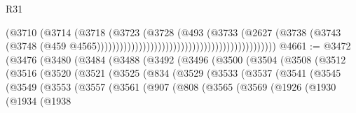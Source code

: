 \begin{lexlean}{R31}
\begin{coremodule}
                                                                          (@3710
                                                                            (@3714
                                                                              (@3718
                                                                                (@3723
                                                                                  (@3728
                                                                                    (@493
                                                                                      (@3733
                                                                                        (@2627
                                                                                          (@3738
                                                                                            (@3743
                                                                                              (@3748
                                                                                                (@459
                                                                                                  @4565)))))))))))))))))))))))))))))))))))))))))))))))
@4661 := @3472
    (@3476
      (@3480
        (@3484
          (@3488
            (@3492
              (@3496
                (@3500
                  (@3504
                    (@3508
                      (@3512
                        (@3516
                          (@3520
                            (@3521
                              (@3525
                                (@834
                                  (@3529
                                    (@3533
                                      (@3537
                                        (@3541
                                          (@3545
                                            (@3549
                                              (@3553
                                                (@3557
                                                  (@3561
                                                    (@907
                                                      (@808
                                                        (@3565
                                                          (@3569
                                                            (@1926
                                                              (@1930
                                                                (@1934
                                                                  (@1938

\end{coremodule}
\end{lexlean}
